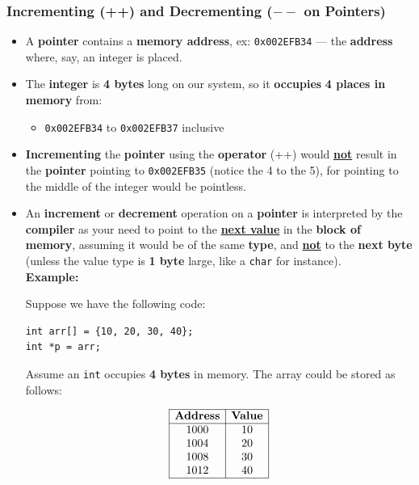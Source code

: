 \documentclass[10pt]{article}
\newcommand{\pbreak}{\vspace{30pt}}
\begin{document}
\subsubsection{Incrementing (++) and Decrementing ($--$ on Pointers)}
\begin{itemize}
	\item A \textbf{pointer} contains a \textbf{memory address}, ex: \verb|0x002EFB34| --- the \textbf{address} where, say, an integer is placed.

	\item The \textbf{integer} is \textbf{4 bytes} long on our system, so it \textbf{occupies} \textbf{4 places in memory} from:
		\begin{itemize}
			\item \verb|0x002EFB34| to \verb|0x002EFB37| inclusive
		\end{itemize}
	
	\item \textbf{Incrementing} the \textbf{pointer} using the \textbf{operator} (++) would \underline{\textbf{not}} result in the \textbf{pointer} pointing to \verb|0x002EFB35| (notice the 4 to the 5), for pointing to the middle of the integer would be pointless.

	\pbreak

\item An \textbf{increment} or \textbf{decrement} operation on a \textbf{pointer} is interpreted by the \textbf{compiler} as your need to point to the \underline{\textbf{next value}} in the \textbf{block of memory}, assuming it would be of the same \textbf{type}, and \underline{\textbf{not}} to the \textbf{next byte} (unless the value type is \textbf{1 byte} large, like a \verb|char| for instance).\\

	\textbf{Example:}

Suppose we have the following code:

\begin{verbatim}
int arr[] = {10, 20, 30, 40};
int *p = arr;
\end{verbatim}

Assume an \verb|int| occupies \textbf{4 bytes} in memory. The array could be stored as follows:

\[
\begin{array}{|c|c|}
\hline
\textbf{Address} & \textbf{Value} \\
\hline
1000 & 10 \\
1004 & 20 \\
1008 & 30 \\
1012 & 40 \\
\hline
\end{array}
\]


\end{itemize}
\end{document}
